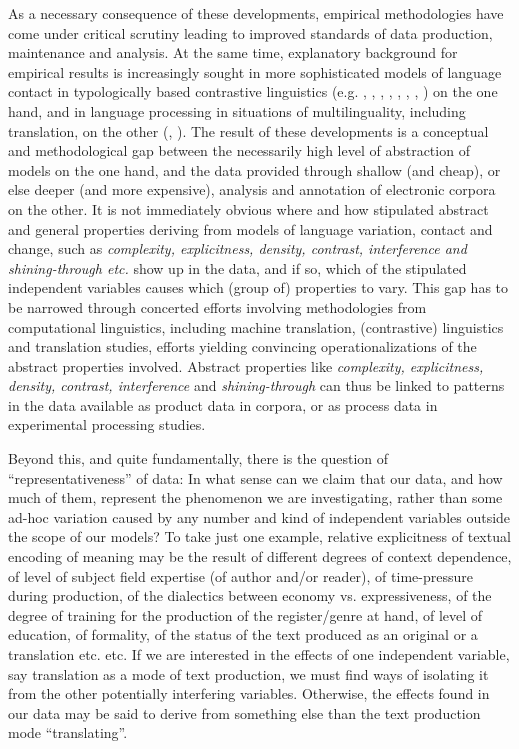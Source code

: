 \documentclass[output=paper]{LSP/langsci}
\begin{document}
As a necessary consequence of these developments, empirical methodologies have come under critical scrutiny leading to improved standards of data production, maintenance and analysis. At the same time, explanatory background for empirical results is increasingly sought in more sophisticated models of language contact in typologically based contrastive linguistics (e.g. \citealt{Thomason2001}, \citealt{Teich2003}, \citealt{Doherty2006}, \citealt{Fabricius-Hansen2008ed},
 \citealt{Siemund2008}, \citealt{Steiner2008}, \citealt{Miestamo2008}, \citealt{Dunn2011}) on the one hand, and in language processing in situations of multilinguality, including translation, on the other (\citealt{AlvesEtAl2010}, \citealt{CarlEtAl2008}). The result of these developments is a conceptual and methodological gap between the necessarily high level of abstraction of models on the one hand, and the data provided through shallow (and cheap), or else deeper (and more expensive), analysis and annotation of electronic corpora on the other. It is not immediately obvious where and how stipulated abstract and general properties deriving from models of language variation, contact and change, such as \textit{complexity, explicitness, density, contrast, interference and shining-through etc.} show up in the data, and if so, which of the stipulated independent variables causes which (group of) properties to vary. This gap has to be narrowed through concerted efforts involving methodologies from computational linguistics, including machine translation, (contrastive) linguistics and translation studies, efforts yielding convincing operationalizations of the abstract properties involved. Abstract properties like \textit{complexity, explicitness, density, contrast, interference} and \textit{shining-through} can thus be linked to patterns in the data available as product data in corpora, or as process data in experimental processing studies.

Beyond this, and quite fundamentally, there is the question of ``representativeness'' of data: In what sense can we claim that our data, and how much of them, represent the phenomenon we are investigating, rather than some ad-hoc variation caused by any number and kind of independent variables outside the scope of our models? To take just one example, relative explicitness of textual encoding of meaning may be the result of different degrees of context dependence, of level of subject field expertise (of author and/or reader), of time-pressure during production, of the dialectics between economy vs. expressiveness, of the degree of training for the production of the register/genre at hand, of level of education, of formality, of the status of the text produced as an original or a translation etc. etc. If we are interested in the effects of one independent variable, say translation as a mode of text production, we must find ways of isolating it from the other potentially interfering variables. Otherwise, the effects found in our data may be said to derive from something else than the text production mode ``translating''. 
\end{document}
